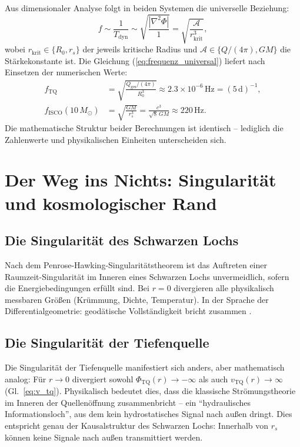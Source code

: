 ﻿\documentclass[12pt,a4paper]{report}
\begin{document}
Aus dimensionaler Analyse folgt in beiden Systemen die universelle Beziehung:
\begin{equation}
	f \sim \frac{1}{T_{\mathrm{dyn}}} \sim \sqrt{\frac{|\nabla^2\Phi|}{1}} = \sqrt{\frac{\mathcal{A}}{r_{\mathrm{krit}}^3}},
	\label{eq:frequenz_universal}
\end{equation}
wobei $r_{\mathrm{krit}} \in \{R_0, r_s\}$ der jeweils kritische Radius und $\mathcal{A} \in \{Q/(4\pi), GM\}$ die Stärke\-konstante ist. Die Gleichung (\ref{eq:frequenz_universal}) liefert nach Einsetzen der numerischen Werte:
\begin{align}
	f_{\mathrm{TQ}} &= \sqrt{\frac{Q_{\mathrm{ges}}/(4\pi)}{R_0^3}} \approx 2.3 \times 10^{-6}\,\mathrm{Hz} = (5\,\mathrm{d})^{-1}, \\
	f_{\mathrm{ISCO}}(10\,M_\odot) &= \sqrt{\frac{GM}{r_s^3}} = \frac{c^3}{\sqrt{8}\,GM} \approx 220\,\mathrm{Hz}.
\end{align}
Die mathematische Struktur beider Berechnungen ist identisch -- lediglich die Zahlenwerte und physikalischen Einheiten unterscheiden sich.

\section{Der Weg ins Nichts: Singularität und kosmologischer Rand}

\subsection{Die Singularität des Schwarzen Lochs}

Nach dem Penrose-Hawking-Singularitätstheorem \cite{penrose1965,hawking1972} ist das Auftreten einer Raumzeit-Singularität im Inneren eines Schwarzen Lochs unvermeidlich, sofern die Energiebedingungen erfüllt sind. Bei $r = 0$ divergieren alle physikalisch messbaren Größen (Krümmung, Dichte, Temperatur). In der Sprache der Differentialgeometrie: geodätische Vollständigkeit bricht zusammen \cite{penrose2004}.

\subsection{Die Singularität der Tiefenquelle}

Die Singularität der Tiefenquelle manifestiert sich anders, aber mathematisch analog: Für $r \to 0$ divergiert sowohl $\Phi_{\mathrm{TQ}}(r) \to -\infty$ als auch $v_{\mathrm{TQ}}(r) \to \infty$ (Gl.~\ref{eq:v_tq}). Physikalisch bedeutet dies, dass die klassische Strömungstheorie im Inneren der Quellenöffnung zusammenbricht -- ein ``hydraulisches Informationsloch'', aus dem kein hydrostatisches Signal nach außen dringt. Dies entspricht genau der Kausalstruktur des Schwarzen Lochs: Innerhalb von $r_s$ können keine Signale nach außen transmittiert werden.
\end{document}

